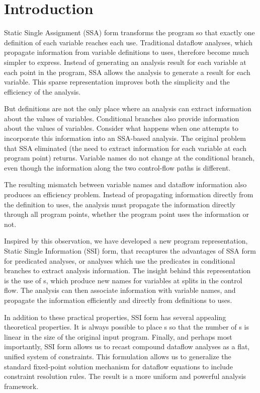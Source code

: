 \section{Introduction}

Static Single Assignment (SSA) form transforms the
program so that exactly one definition of each 
variable reaches each use. Traditional dataflow
analyses, which propagate information from variable
definitions to uses, therefore become much simpler
to express. Instead of generating an analysis 
result for each variable at each point in the
program, SSA allows the analysis to generate a 
result for each variable. This sparse
representation improves both the simplicity
and the efficiency of the analysis. 

But definitions are not the only place where
an analysis can extract information about the
values of variables. Conditional branches also
provide information about the values of variables.
Consider what happens when one attempts to incorporate
this information into an SSA-based analysis. The
original problem that SSA eliminated (the need to
extract information for each variable at each
program point) returns. Variable names do not
change at the conditional branch, even though
the information along the two control-flow
paths is different.

The resulting mismatch between variable names
and dataflow information also produces an efficiency
problem. Instead of propagating information
directly from the definition to uses, the analysis
must propagate the information directly through all 
program points, whether the program point uses
the information or not. 

Inspired by this observation, we have developed
a new program representation, 
Static Single Information (SSI) form,  that recaptures
the advantages of SSA form for predicated analyses,
or analyses which use the predicates in conditional
branches to extract analysis information.
The insight behind this representation is the use
of \sigfunction{}s, which produce new names
for variables at splits in the control flow.
The analysis can then associate information
with variable names, and propagate
the information efficiently and directly from 
definitions to uses. 

In addition to these practical properties, 
SSI form has several appealing 
theoretical properties. It is always possible 
to place \sigfunction{}s so that the
number of \sigfunction{}s is linear in the size
of the original input program. %
Finally, and perhaps most importantly, SSI form
allows us to recast compound dataflow analyses as
a flat, unified system of constraints. This
formulation allows us to generalize the standard
fixed-point solution
mechanism for dataflow equations to include 
constraint resolution rules. The result is 
a more uniform and powerful analysis framework.

